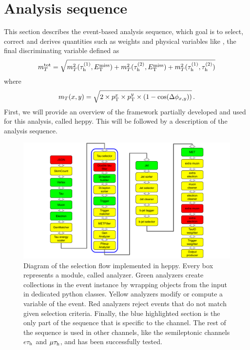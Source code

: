 \section{Analysis sequence}
\label{sec:analysis_eventsel}

This section describes the event-based analysis sequence, which goal is to select, correct and derives quantities such as weights and physical variables like \mttot, the final discriminating variable defined as 
\begin{equation}
    m_{T}^{\mathrm{tot}} = \sqrt{m_{T}^2(\tau_{\rm h}^{(1)},E_{\mathrm{T}}^{\text{miss}}) + m_{T}^2(\tau_{\rm h}^{(2)},E_{\mathrm{T}}^{\text{miss}}) + m_{T}^2(\tau_{\rm h}^{(1)},\tau_{\rm h}^{(2)})}
\end{equation}
where
\begin{equation}
    m_T (x,y) = \sqrt{2\times \pt^x \times \pt^y \times (1-\mathrm{cos}(\Delta \phi_{x,y}))} \mend
\end{equation}
First, we will provide an overview of the framework partially developed and used for this analysis, called heppy. This will be followed by a description of the analysis sequence.

\begin{figure}
    \centering
    \includegraphics[width=\textwidth]{Images/HEPPY_diagram.pdf}
    \caption{Diagram of the selection flow implemented in heppy. Every box represents a module, called analyzer. Green analyzers create collections in the event instance by wrapping objects from the input in dedicated python classes. Yellow analyzers modify or compute a variable of the event. Red analyzers reject events that do not match given selection criteria. Finally, the blue highlighted section is the only part of the sequence that is specific to the \tauh\tauh channel. The rest of the sequence is used in other channels, like the semileptonic channels $e\tau_{\rm h}$ and $\mu\tau_{\rm h}$, and has been successfully tested.}
    \label{fig:HEPPY}
\end{figure}

